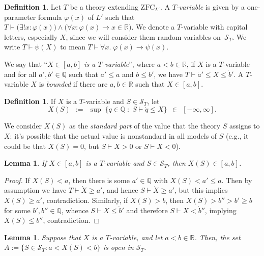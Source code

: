 \documentclass[12pt]{article}
\newcommand{\vp}{\varphi}
\newcommand{\RR}{\mathbb{R}}
\newcommand{\QQ}{\mathbb{Q}}
\newcommand{\zfc}{\mathrm{ZFC}}
\newcommand{\zfcl}{{\zfc_{\cL}}}
\newcommand{\cL}{L'}
\newcommand{\cS}{\mathcal{S}}
\newcommand{\inClosed}[1]{#1 \in [a, b]}
\newcommand{\Tvar}{$T$-variable}
\theoremstyle{plain}
\newtheorem{lemma}[theorem]{Lemma}
\theoremstyle{definition}
\newtheorem{definition}[theorem]{Definition}
\theoremstyle{remark}
\begin{document}
\begin{definition}
Let $T$ be a theory extending $\zfcl$. 
A \emph{\Tvar{}}
is given by a one-parameter formula $\vp(x)$ of $\cL$ such that $T\vdash\big(\exists!x:\vp(x)\big)\wedge\big(\forall x:\vp(x)\to x\in\RR\big)$. 
We denote a \Tvar{} with capital letters, especially $X$, since we will consider them random variables on~$\cS_T$.
We write $T\vdash\psi(X)$ to mean $T\vdash\forall x.\;\vp(x)\to\psi(x)$.

We say that ``\emph{$X\in[a,b]$ is a \Tvar{}}'', where $a<b\in\RR$, if $X$ is a \Tvar{} and for all $a',b'\in\QQ$ such that $a'\le a$ and $b\le b'$, we have $T\vdash\dot a'\le X\le \dot b'$.
A \Tvar{} $X$ is \emph{bounded} if there are $a,b\in\RR$ such that $\inClosed{X}$.
\end{definition}
\begin{definition}
If $X$ is a \Tvar{} and $S\in\cS_T$, let
\[X(S) \;\,:=\;\, \sup\;\{q\in\QQ \;:\; S\vdash \dot q \le X\} \;\,\in\;\, [-\infty,\infty].\]
\end{definition}
We consider $X(S)$ as the \emph{standard part} of the value that the theory $S$ assigns to $X$: it's possible that the actual value is nonstandard in all models of $S$ (e.g., it could be that $X(S) = 0$, but $S\vdash X>0$ or $S\vdash X<0$).
\begin{lemma}
If $X\in[a,b]$ is a \Tvar{} and $S\in\cS_T$, then $X(S)\in[a,b]$.
\end{lemma}
\begin{proof}
If $X(S) < a$, then there is some $a'\in\QQ$ with $X(S) < a' \le a$. 
Then by assumption we have $T\vdash\dot X\geq a'$, and hence $S\vdash\dot X\geq a'$, but this implies $X(S)\ge a'$, contradiction.
Similarly, if $X(S) > b$, then $X(S) > b'' > b' \ge b$ for some $b',b''\in\QQ$, whence $S\vdash X\le\dot b'$ and therefore $S\vdash X<\dot b''$, implying $X(S) \le b''$, contradiction.
\end{proof}
\begin{lemma}
Suppose that $X$ is a \Tvar{}, and let $a<b\in\RR$. Then, the set $A := \{S\in\cS_T : a< X(S)<b\}$ is open in $\cS_T$.
\end{lemma}
\end{document}
